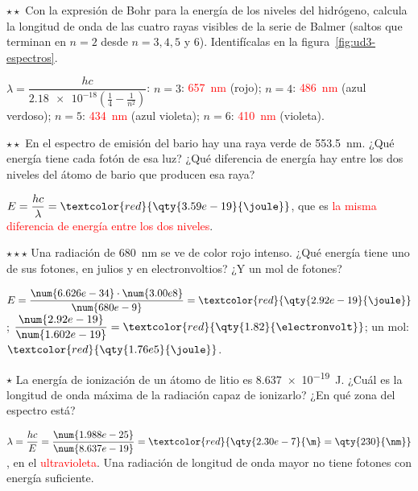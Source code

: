 \begin{exercise}
    \(\star\star\) Con la expresión de Bohr para la energía de los niveles del hidrógeno, calcula la longitud de onda de las cuatro
    rayas visibles de la serie de Balmer (saltos que terminan en \(n = 2\) desde \(n = 3, 4, 5\) y 6). Identifícalas en la
    figura~\ref{fig:ud3-espectros}.
    \begin{solu}
        \(\lambda = \dfrac{h c}{\num{2.18e-18} \left( \frac{1}{4} - \frac{1}{n^2} \right)}\): \(n = 3\): \textcolor{red}{\qty{657}{\nm}}
        (rojo); \(n = 4\): \textcolor{red}{\qty{486}{\nm}} (azul verdoso); \(n = 5\): \textcolor{red}{\qty{434}{\nm}} (azul
        violeta); \(n = 6\): \textcolor{red}{\qty{410}{\nm}} (violeta).
    \end{solu}
\end{exercise}

\begin{exercise}
    \(\star\star\) En el espectro de emisión del bario hay una raya verde de \qty{553.5}{\nm}. ¿Qué energía tiene cada fotón de esa
    luz? ¿Qué diferencia de energía hay entre los dos niveles del átomo de bario que producen esa raya?
    \begin{solu}
        \(E = \dfrac{h c}{\lambda} = \textcolor{red}{\qty{3.59e-19}{\joule}}\), que es \textcolor{red}{la misma diferencia de energía
        entre los dos niveles}.
    \end{solu}
\end{exercise}

\begin{exercise}
    \(\star\star\star\) Una radiación de \qty{680}{\nm} se ve de color rojo intenso. ¿Qué energía tiene uno de sus fotones, en julios
    y en electronvoltios? ¿Y un mol de fotones?
    \begin{solu}
        \(E = \dfrac{\num{6.626e-34} \cdot \num{3.00e8}}{\num{680e-9}} = \textcolor{red}{\qty{2.92e-19}{\joule}}\);
        \(\dfrac{\num{2.92e-19}}{\num{1.602e-19}} = \textcolor{red}{\qty{1.82}{\electronvolt}}\); un mol:
        \(\textcolor{red}{\qty{1.76e5}{\joule}}\).
    \end{solu}
\end{exercise}

\begin{exercise}
    \(\star\) La energía de ionización de un átomo de litio es \qty{8.637e-19}{\joule}. ¿Cuál es la longitud de onda máxima de la
    radiación capaz de ionizarlo? ¿En qué zona del espectro está?
    \begin{solu}
        \(\lambda = \dfrac{h c}{E} = \dfrac{\num{1.988e-25}}{\num{8.637e-19}} = \textcolor{red}{\qty{2.30e-7}{\m} = \qty{230}{\nm}}\),
        en el \textcolor{red}{ultravioleta}. Una radiación de longitud de onda mayor no tiene fotones con energía suficiente.
    \end{solu}
\end{exercise}

